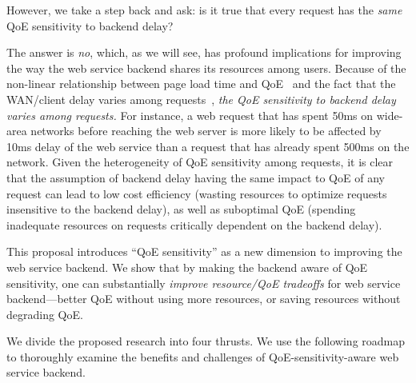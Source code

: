 However, we take a step back and ask: is it true that every request has the {\em same} QoE sensitivity to backend delay?

The answer is {\em no}, which, as we will see, has profound implications for improving the way the web service backend shares its resources among users. 
Because of the non-linear relationship between page load time and QoE~\cite{??} and the fact that the WAN/client delay varies among requests~\cite{timecard,dqbarge}, {\em the QoE sensitivity to backend delay varies among requests.}
For instance, a web request that has spent 50ms on wide-area networks before reaching the web server is more likely to be affected by 10ms delay of the web service than a request that has already spent 500ms on the network. 
Given the heterogeneity of QoE sensitivity among requests, it is clear that the assumption of backend delay having the same impact to QoE of any request can lead to low cost efficiency (wasting resources to optimize requests insensitive to the backend delay), as well as suboptimal QoE (spending inadequate resources on requests critically dependent on the backend delay). 


This proposal introduces ``QoE sensitivity'' as a new dimension to improving the web service backend. 
We show that by making the backend aware of QoE sensitivity, one can substantially {\em improve resource/QoE tradeoffs} for web service backend---\ie better QoE without using more resources, or saving resources without degrading QoE. 

We divide the proposed research into four thrusts.
We use the following roadmap to thoroughly examine the benefits and challenges of QoE-sensitivity-aware web service backend.

\vspace{0.2cm}

